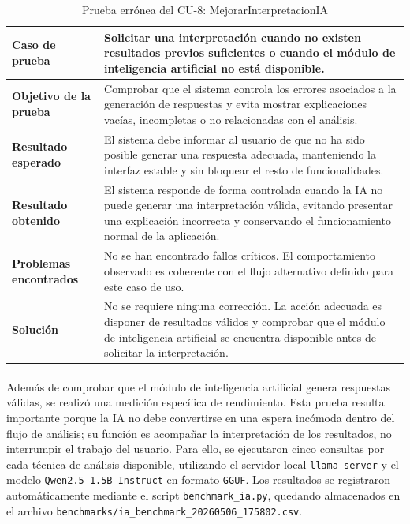 \begin{table}[H]
\centering
\small
\begin{tabularx}{\textwidth}{|p{}|X|}
\hline
\textbf{Caso de prueba} & Solicitar una interpretación cuando no existen resultados previos suficientes o cuando el módulo de inteligencia artificial no está disponible. \\ \hline
\textbf{Objetivo de la prueba} & Comprobar que el sistema controla los errores asociados a la generación de respuestas y evita mostrar explicaciones vacías, incompletas o no relacionadas con el análisis. \\ \hline
\textbf{Resultado esperado} & El sistema debe informar al usuario de que no ha sido posible generar una respuesta adecuada, manteniendo la interfaz estable y sin bloquear el resto de funcionalidades. \\ \hline
\textbf{Resultado obtenido} & El sistema responde de forma controlada cuando la IA no puede generar una interpretación válida, evitando presentar una explicación incorrecta y conservando el funcionamiento normal de la aplicación. \\ \hline
\textbf{Problemas encontrados} & No se han encontrado fallos críticos. El comportamiento observado es coherente con el flujo alternativo definido para este caso de uso. \\ \hline
\textbf{Solución} & No se requiere ninguna corrección. La acción adecuada es disponer de resultados válidos y comprobar que el módulo de inteligencia artificial se encuentra disponible antes de solicitar la interpretación. \\ \hline
\end{tabularx}
\caption{Prueba errónea del CU-8: MejorarInterpretacionIA}
\label{tab:prueba_erronea_cu8}
\normalsize
\end{table}


\paragraph*{}Además de comprobar que el módulo de inteligencia artificial genera respuestas válidas, se realizó una medición específica de rendimiento. Esta prueba resulta importante porque la IA no debe convertirse en una espera incómoda dentro del flujo de análisis; su función es acompañar la interpretación de los resultados, no interrumpir el trabajo del usuario. Para ello, se ejecutaron cinco consultas por cada técnica de análisis disponible, utilizando el servidor local \texttt{llama-server} y el modelo \texttt{Qwen2.5-1.5B-Instruct} en formato \texttt{GGUF}. Los resultados se registraron automáticamente mediante el script \texttt{benchmark\_ia.py}, quedando almacenados en el archivo \texttt{benchmarks/ia\_benchmark\_20260506\_175802.csv}.


